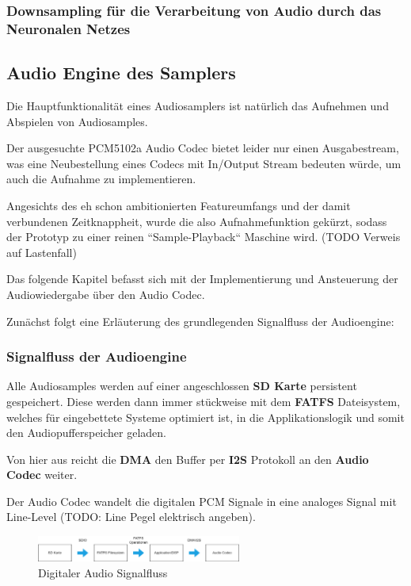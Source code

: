 \subsubsection{Downsampling für die Verarbeitung von Audio durch das Neuronalen Netzes}



\subsection{Audio Engine des Samplers}


Die Hauptfunktionalität eines Audiosamplers ist natürlich das Aufnehmen und Abspielen von Audiosamples. 

Der ausgesuchte PCM5102a Audio Codec bietet leider nur einen Ausgabestream, was eine Neubestellung eines Codecs mit In/Output Stream bedeuten würde, um auch die Aufnahme zu implementieren.

Angesichts des eh schon ambitionierten Featureumfangs und der damit verbundenen Zeitknappheit, wurde die also Aufnahmefunktion gekürzt, sodass der Prototyp zu einer reinen ``Sample-Playback`` Maschine wird. (TODO Verweis auf Lastenfall)


Das folgende Kapitel befasst sich mit der Implementierung und Ansteuerung der Audiowiedergabe über den Audio Codec.

Zunächst folgt eine Erläuterung des grundlegenden Signalfluss der Audioengine:

\subsubsection{Signalfluss der Audioengine}

Alle Audiosamples werden auf einer angeschlossen \textbf{SD Karte} persistent gespeichert. Diese werden dann immer stückweise mit dem \textbf{FATFS} Dateisystem, welches für eingebettete Systeme optimiert ist, in die Applikationslogik und somit den Audiopufferspeicher geladen. 

Von hier aus reicht die \textbf{DMA} den Buffer per \textbf{I2S} Protokoll an den \textbf{Audio Codec} weiter. 

Der Audio Codec wandelt die digitalen PCM Signale in eine analoges Signal mit Line-Level (TODO: Line Pegel elektrisch angeben).

\begin{figure}[h!]
	\centering
	\includegraphics[width=0.6\textwidth]{images/08_durchfuehrung/audio/audio_signalflow.drawio.png}
	\caption{Digitaler Audio Signalfluss}
	\label{fig:audio_signalflow}
\end{figure}



